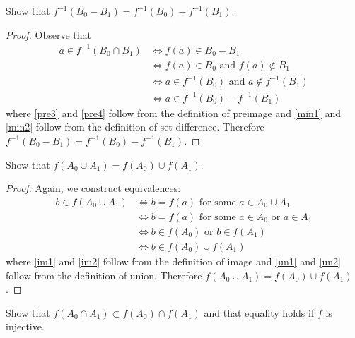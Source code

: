 \documentclass[11pt]{article}
\newenvironment{p}[1]{
  \begin{trivlist}
\item[\hskip \labelsep {\bfseries (#1)}]}
  {\end{trivlist}}
\begin{document}
\begin{p}{d}
  Show that $f^{-1}(B_0 - B_1) = f^{-1}(B_0) - f^{-1}(B_1)$.
\end{p}

\begin{proof}
  Observe that
  \begin{align}
    a \in f^{-1}(B_0 \cap B_1)
      &\iff f(a) \in B_0 - B_1 \label{pre3} \\
      &\iff f(a) \in B_0 \text{ and } f(a) \notin B_1 \label{min1} \\
      &\iff a \in f^{-1}(B_0) \text{ and } a \notin f^{-1}(B_1) \label{pre4} \\
      &\iff a \in f^{-1}(B_0) - f^{-1}(B_1) \label{min2}
  \end{align}
  where \eqref{pre3} and \eqref{pre4} follow from the definition of preimage and
  \eqref{min1} and \eqref{min2} follow from the definition of set difference. Therefore
  $f^{-1}(B_0 - B_1) = f^{-1}(B_0) - f^{-1}(B_1)$.
\end{proof}

\begin{p}{f}
  Show that $f(A_0 \cup A_1) = f(A_0) \cup f(A_1)$.
\end{p}

\begin{proof}
  Again, we construct equivalences:
  \begin{align}
    b \in f(A_0 \cup A_1)
      &\iff b = f(a) \text{ for some } a \in A_0 \cup A_1 \label{im1} \\
      &\iff b = f(a) \text{ for some } a \in A_0 \text{ or } a \in A_1 \label{un1} \\
      &\iff b \in f(A_0) \text{ or } b \in f(A_1) \label{im2} \\
      &\iff b \in f(A_0) \cup f(A_1) \label{un2}
  \end{align}
  where \eqref{im1} and \eqref{im2} follow from the definition of image and
  \eqref{un1} and \eqref{un2} follow from the definition of union. Therefore
  $f(A_0 \cup A_1) = f(A_0) \cup f(A_1)$.
\end{proof}

\begin{p}{g}
  Show that $f(A_0 \cap A_1) \subset f(A_0) \cap f(A_1)$ and that equality
  holds if $f$ is injective.
\end{p}
\end{document}
